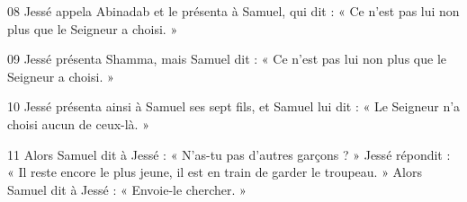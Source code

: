 
08 Jessé appela Abinadab et le présenta à Samuel, qui dit : « Ce n’est pas lui non plus que le Seigneur a choisi. »

09 Jessé présenta Shamma, mais Samuel dit : « Ce n’est pas lui non plus que le Seigneur a choisi. »

10 Jessé présenta ainsi à Samuel ses sept fils, et Samuel lui dit : « Le Seigneur n’a choisi aucun de ceux-là. »

11 Alors Samuel dit à Jessé : « N’as-tu pas d’autres garçons ? » Jessé répondit : « Il reste encore le plus jeune, il est en train de garder le troupeau. » Alors Samuel dit à Jessé : « Envoie-le chercher. »